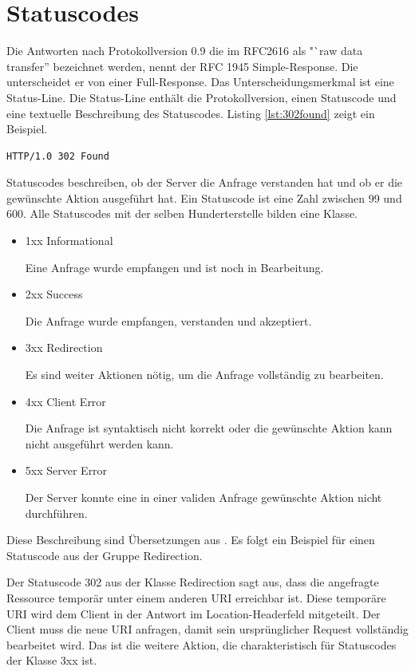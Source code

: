 \documentclass{llncs}
\begin{document}
\section{Statuscodes}
Die Antworten nach Protokollversion 0.9 die im RFC2616 als "`raw data transfer'' bezeichnet werden, nennt der RFC 1945 Simple-Response. Die unterscheidet er von einer Full-Response. Das Unterscheidungsmerkmal ist eine Status-Line. Die Status-Line enthält die Protokollversion, einen Statuscode und eine textuelle Beschreibung des Statuscodes. Listing \ref{lst:302found} zeigt ein Beispiel.

\begin{lstlisting}[caption={Statuscode 302},label={lst:302found}]
HTTP/1.0 302 Found
\end{lstlisting}

Statuscodes beschreiben, ob der Server die Anfrage verstanden hat und ob er die gewünschte Aktion ausgeführt hat. Ein Statuscode ist eine Zahl zwischen 99 und 600. Alle Statuscodes mit der selben Hunderterstelle bilden eine Klasse.

\begin{itemize}
\item 1xx Informational

Eine Anfrage wurde empfangen und ist noch in Bearbeitung.
\item 2xx Success

Die Anfrage wurde empfangen, verstanden und akzeptiert.
\item 3xx Redirection

Es sind weiter Aktionen nötig, um die Anfrage vollständig zu bearbeiten.
\item 4xx Client Error

Die Anfrage ist syntaktisch nicht korrekt oder die gewünschte Aktion kann nicht ausgeführt werden kann.
\item 5xx Server Error

Der Server konnte eine in einer validen Anfrage gewünschte Aktion nicht durchführen.
\end{itemize}

Diese Beschreibung sind Übersetzungen aus \cite{Fielding1999}. Es folgt ein Beispiel für einen Statuscode aus der Gruppe Redirection.


Der Statuscode 302 aus der Klasse Redirection sagt aus, dass die angefragte Ressource temporär unter einem anderen URI erreichbar ist. Diese temporäre URI wird dem Client in der Antwort im Location-Headerfeld mitgeteilt. Der Client muss die neue URI anfragen, damit sein ursprünglicher Request vollständig bearbeitet wird. Das ist die weitere Aktion, die charakteristisch für Statuscodes der Klasse 3xx ist. 
   
\end{document}
